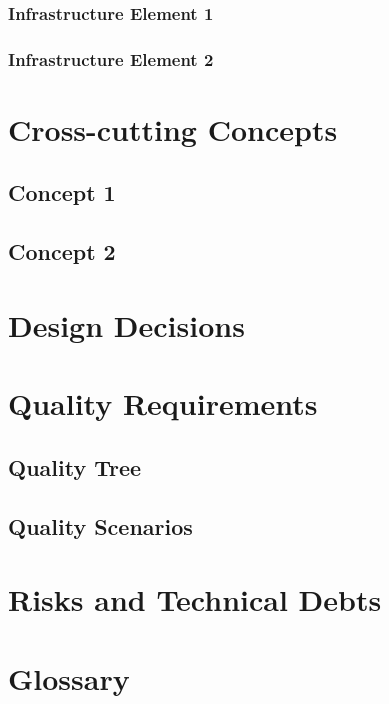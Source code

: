 \documentclass[a4paper]{paper}
\begin{document}
\subsubsection{Infrastructure Element 1}
\subsubsection{Infrastructure Element 2}
\newpage\section{Cross-cutting Concepts}
\subsection{Concept 1}
\subsection{Concept 2}
\newpage\section{Design Decisions}
\newpage\section{Quality Requirements}
\subsection{Quality Tree}
\subsection{Quality Scenarios}
\newpage\section{Risks and Technical Debts}
\newpage\section{Glossary}
\end{document}
